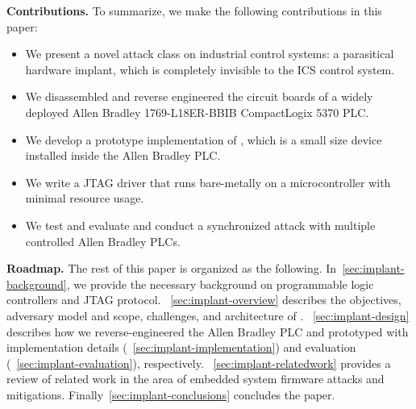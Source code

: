 \textbf{Contributions.} To summarize, we make the following contributions in this paper:
\begin{itemize}[leftmargin=*]
	\item We present a novel attack class on industrial control systems: a parasitical hardware implant, which is completely invisible to the ICS control system.
	\item We disassembled and reverse engineered the circuit boards of a widely deployed Allen Bradley 1769-L18ER-BBIB CompactLogix 5370 PLC. 
	\item We develop a prototype implementation of \name, which is a small size device installed inside the Allen Bradley PLC. 
	\item We write a JTAG driver that runs bare-metally on a microcontroller with minimal resource usage.
	\item We test and evaluate \name and conduct a synchronized attack with multiple controlled Allen Bradley PLCs. 
\end{itemize}


\textbf{Roadmap.} The rest of this paper is organized as the following. In~\autoref{sec:implant-background}, we provide the necessary background on programmable logic controllers and JTAG protocol. ~\autoref{sec:implant-overview} describes the objectives, adversary model and scope, challenges, and architecture of \name. ~\autoref{sec:implant-design} describes how we reverse-engineered the Allen Bradley PLC and prototyped \name with implementation details (~\autoref{sec:implant-implementation}) and evaluation (~\autoref{sec:implant-evaluation}), respectively. ~\autoref{sec:implant-relatedwork} provides a review of related work in the area of embedded system firmware attacks and mitigations. Finally~\autoref{sec:implant-conclusions} concludes the paper.



